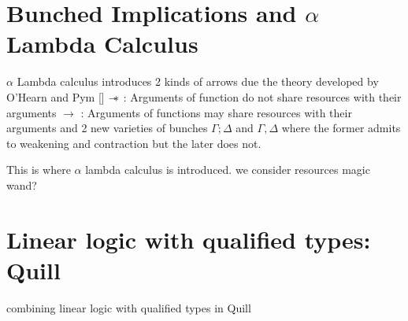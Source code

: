 \section{Bunched Implications and $\alpha$ Lambda Calculus}
$\alpha$ Lambda calculus introduces 2 kinds of arrows due the theory
developed by O'Hearn and Pym [\cite{ohearn_logic_1999}]
$\mathrel{-\mkern-6mu*}$     : Arguments of function do not share resources with their arguments
$\rightarrow$ : Arguments of functions may share resources with their arguments
and 2 new varieties of bunches $\Gamma; \Delta$ and $\Gamma, \Delta$ where
the former admits to weakening and contraction but the later does not.

This is where $\alpha$ lambda calculus is introduced. we consider resources
magic wand?


\section{Linear logic with qualified types: Quill}
combining linear logic with qualified types in Quill \cite{morris_best_2016}


